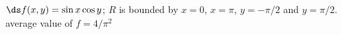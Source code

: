 {$\ds f(x,y) = \sin x\cos y$; \quad $R$ is bounded by $x=0$, $x=\pi$, $y=-\pi/2$ and $y=\pi/2$.
}
{average value of $f= 4/\pi^2$
}